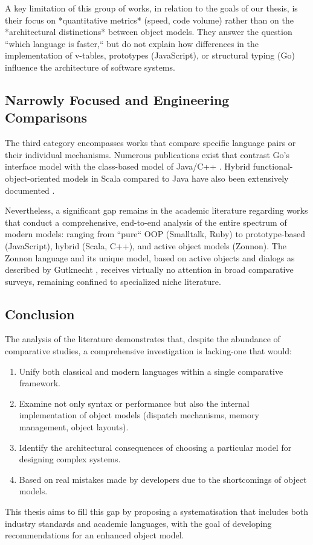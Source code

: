 A key limitation of this group of works, in relation to the goals of our thesis, is their focus on *quantitative metrics* (speed, code volume) rather than on the *architectural distinctions* between object models. They answer the question ``which language is faster,`` but do not explain how differences in the implementation of v-tables, prototypes (JavaScript), or structural typing (Go) influence the architecture of software systems.

\subsection{Narrowly Focused and Engineering Comparisons}

The third category encompasses works that compare specific language pairs or their individual mechanisms. Numerous publications exist that contrast Go's interface model with the class-based model of Java/C++ \cite{pike2012go, balbaert2012way}. Hybrid functional-object-oriented models in Scala compared to Java have also been extensively documented \cite{odersky2014unifying}.

Nevertheless, a significant gap remains in the academic literature regarding works that conduct a comprehensive, end-to-end analysis of the entire spectrum of modern models: ranging from ``pure`` OOP (Smalltalk, Ruby) to prototype-based (JavaScript), hybrid (Scala, C++), and active object models (Zonnon). The Zonnon language and its unique model, based on active objects and dialogs as described by Gutknecht \cite{gutknecht2004zonnon}, receives virtually no attention in broad comparative surveys, remaining confined to specialized niche literature.

\subsection{Conclusion}

The analysis of the literature demonstrates that, despite the abundance of comparative studies, a comprehensive investigation is lacking-one that would:

\begin{enumerate}
    \item Unify both classical and modern languages within a single comparative framework.
    \item Examine not only syntax or performance but also the internal implementation of object models (dispatch mechanisms, memory management, object layouts).
    \item Identify the architectural consequences of choosing a particular model for designing complex systems.
    \item Based on real mistakes made by developers due to the shortcomings of object models.
\end{enumerate}

This thesis aims to fill this gap by proposing a systematisation that includes both industry standards and academic languages, with the goal of developing recommendations for an enhanced object model.
